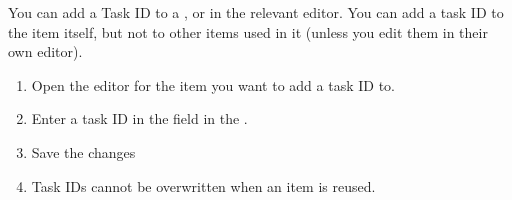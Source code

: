 
You can add a Task ID to a \gdcase{}, \gdsuite{} or \gdjob{} in the relevant editor.  You can add a task ID to the  item itself, but not to other items used in it (unless you edit them in their own editor). 


\begin{enumerate}
\item Open the editor for the item you want to add a task ID to. 
\item Enter a task ID in the  field in the  \gdpropview{}. 
\item Save the changes
\item Task IDs cannot be overwritten when an item is reused.
\end{enumerate}

